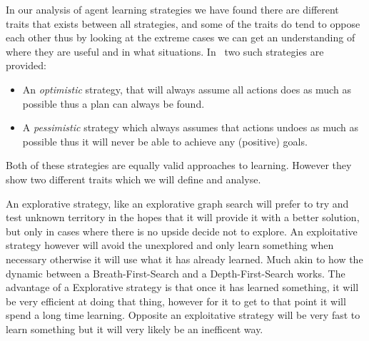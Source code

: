 \documentclass[../Master.tex]{subfiles}
\begin{document}
	In our analysis of agent learning strategies we have found there are different traits that exists between all strategies, and some of the traits do tend to oppose each other thus by looking at the extreme cases we can get an understanding of where they are useful and in what situations. In~\cite{Walsh2008} two such strategies are provided:
    \begin{itemize}
    \item An \emph{optimistic} strategy, that will always assume all actions
    does as much as possible thus a plan can always be found.
    \item A \emph{pessimistic} strategy which always assumes that actions undoes
    as much as possible thus it will never be able to achieve any (positive)
    goals.
    \end{itemize}
    Both of these strategies are equally valid approaches to learning.
    However they show two different traits which we will define and analyse.
    \begin{definition}
     An explorative strategy, like an explorative graph search will prefer to try and test unknown territory in the hopes that it will provide it with a better solution, but only in cases where there is no upside decide not to explore.
    An exploitative strategy however will avoid the unexplored and only learn something when necessary otherwise it will use what it has already learned. Much akin to how the dynamic between a Breath-First-Search and a Depth-First-Search works. The advantage of a Explorative strategy is that once it has learned something, it will be very efficient at doing that thing, however for it to get to that point it will spend a long time learning. Opposite an exploitative strategy will be very fast to learn something but it will very likely be an inefficent way.
	\end{definition}
\end{document}
